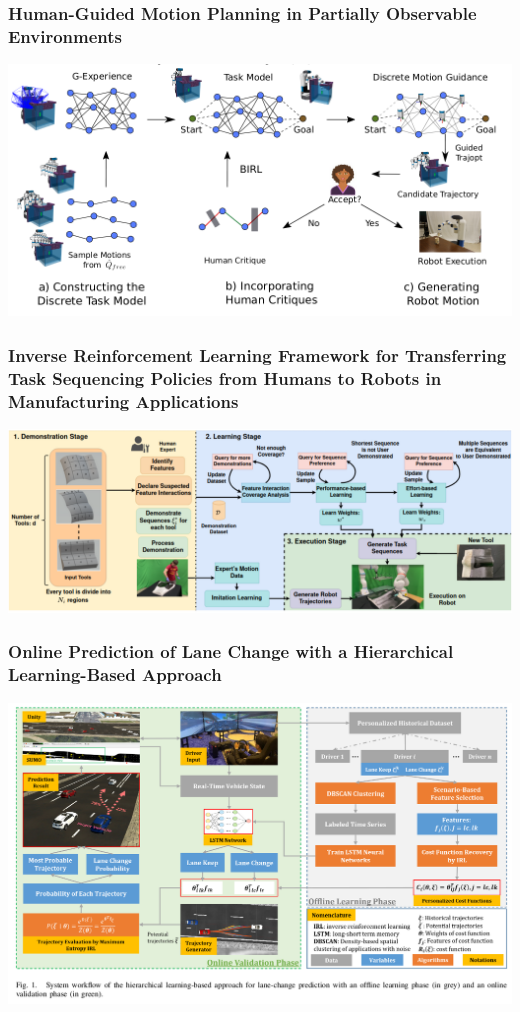 \begin{frame}
    \frametitle{Human-{Guided} {Motion} {Planning} in {Partially} {Observable} {Environments} \cite{quintero-pena_human-guided_2022}}

    \begin{center}
        \includegraphics[width=0.55\linewidth]{content/images/human_guided.png}
    \end{center}
\end{frame}

\begin{frame}
    \frametitle{Inverse {Reinforcement} {Learning} {Framework} for {Transferring} {Task} {Sequencing} {Policies} from {Humans} to {Robots} in {Manufacturing} {Applications} \cite{manyar_inverse_2023}}

    \begin{center}
        \includegraphics[width=0.7\linewidth]{content/images/inversereinforce.png}
    \end{center}
\end{frame}

\begin{frame}
    \frametitle{Online Prediction of Lane Change with a Hierarchical Learning-Based Approach \cite{liao_online_2022}}

    \begin{center}
        \includegraphics[width=0.6\linewidth]{content/images/lanechange.png}
    \end{center}
\end{frame}

